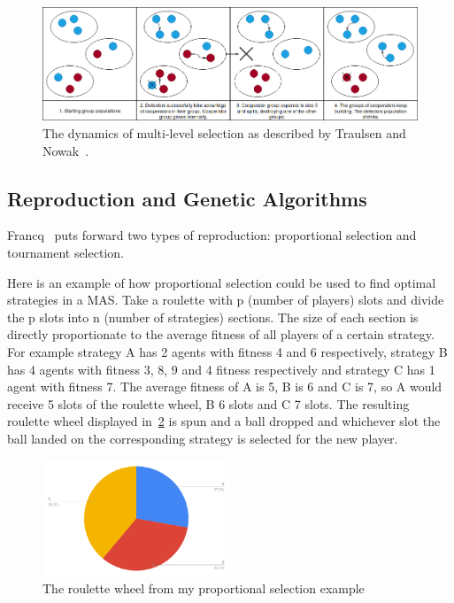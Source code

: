 \documentclass[]{final_report}
\begin{document}
\begin{figure}
	\center
	\includegraphics[width=\textwidth]{GroupSelection.png}
	\caption{The dynamics of multi-level selection as described by Traulsen and Nowak~\cite{multilevel_nowak}.}
	\label{fig:group}
\end{figure}

\subsection{Reproduction and Genetic Algorithms}
\label{appendix:reprodgen}
Francq~\cite{genetic_algorithms} puts forward two types of reproduction: proportional selection and tournament selection.\par
Here is an example of how proportional selection could be used to find optimal strategies in a MAS. Take a roulette with p (number of players) slots and divide the p slots into n (number of strategies) sections. The size of each section is directly proportionate to the average fitness of all players of a certain strategy. For example strategy A has 2 agents with fitness 4 and 6 respectively, strategy B has 4 agents with fitness 3, 8, 9 and 4 fitness respectively and strategy C has 1 agent with fitness 7. The average fitness of A is 5, B is 6 and C is 7, so A would receive 5 slots of the roulette wheel, B 6 slots and C 7 slots. The resulting roulette wheel displayed in~\ref{fig:roulette_wheel} is spun and a ball dropped and whichever slot the ball landed on the corresponding strategy is selected for the new player.\par
\begin{figure}
	\begin{center}
	\includegraphics[width=0.5\textwidth]{reproduction_chart.png}
	\caption{The roulette wheel from my proportional selection example}
	\label{fig:roulette_wheel}
	\end{center}
\end{figure}
\end{document}
